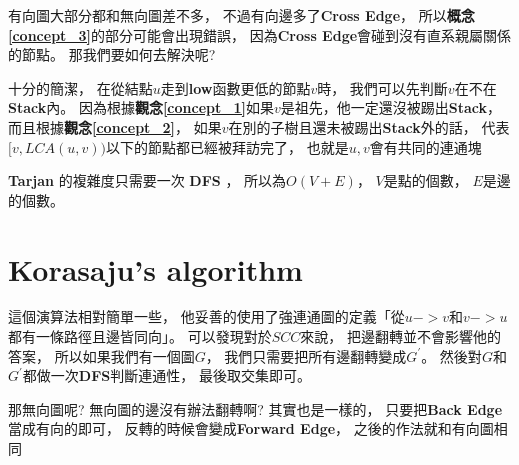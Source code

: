 \documentclass[12pt,oneside]{article}
\begin{document}
有向圖大部分都和無向圖差不多，
不過有向邊多了\textbf{Cross Edge}，
所以\textbf{概念\ref{concept_3}}的部分可能會出現錯誤，
因為\textbf{Cross Edge}會碰到沒有直系親屬關係的節點。
那我們要如何去解決呢?

十分的簡潔，
在從結點$u$走到\textbf{low}函數更低的節點$v$時，
我們可以先判斷$v$在不在\textbf{Stack}內。
因為根據\textbf{觀念\ref{concept_1}}如果$v$是祖先，他一定還沒被踢出\textbf{Stack}，
而且根據\textbf{觀念\ref{concept_2}}，
如果$v$在別的子樹且還未被踢出\textbf{Stack}外的話，
代表$[ v, LCA(u, v) )$以下的節點都已經被拜訪完了，
也就是$u, v$會有共同的連通塊

\textbf{Tarjan} 的複雜度只需要一次 \textbf{DFS} ， 所以為$O(V+E)$，
$V$是點的個數，
$E$是邊的個數。

\section{Korasaju's algorithm}
這個演算法相對簡單一些，
他妥善的使用了強連通圖的定義「從$u->v$和$v->u$都有一條路徑且邊皆同向」。
可以發現對於$SCC$來說，
把邊翻轉並不會影響他的答案，
所以如果我們有一個圖$G$，
我們只需要把所有邊翻轉變成$G^{'}$。
然後對$G$和$G^{'}$都做一次\textbf{DFS}判斷連通性，
最後取交集即可。

那無向圖呢?
無向圖的邊沒有辦法翻轉啊?
其實也是一樣的，
只要把\textbf{Back Edge}當成有向的即可，
反轉的時候會變成\textbf{Forward Edge}，
之後的作法就和有向圖相同
\end{document}
